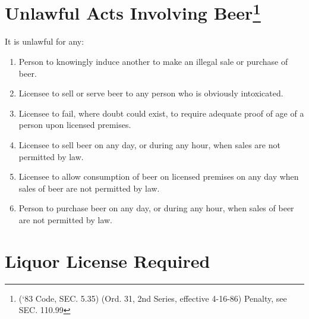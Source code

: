 \section{Unlawful Acts Involving Beer\footnote{(‘83 Code, SEC. 5.35)  (Ord. 31, 2nd Series, effective 4-16-86)  Penalty, see SEC. 110.99}}
It is unlawful for any:
\begin{enumerate}[{\indent}A)]
    \item Person to knowingly induce another to make an illegal sale or purchase of beer.
    \item Licensee to sell or serve beer to any person who is obviously intoxicated.
    \item Licensee to fail, where doubt could exist, to require adequate proof of age of a person upon licensed premises.
    \item Licensee to sell beer on any day, or during any hour, when sales are not permitted by law.
    \item Licensee to allow consumption of beer on licensed premises on any day when sales of beer are not permitted by law.
    \item Person to purchase beer on any day, or during any hour, when sales of beer are not permitted by law.
\end{enumerate}


\setcounter{section}{79}
\section{Liquor License Required}
